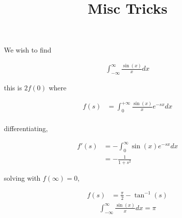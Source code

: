 \documentclass{article}
\title{Misc Tricks}
\date{}
\begin{document}
\maketitle

We wish to find

\begin{align}
\int_{-\infty}^{\infty} \frac{\sin(x)}{x} dx
\end{align}

this is $2f(0)$ where

\begin{align}
f(s)  &= \int_0^{+\infty} \frac{\sin(x)}{x} e^{-sx} dx \\
\end{align}

differentiating,

\begin{align}
f'(s) &=-\int_{0} ^\infty {\sin(x)}{e^{-sx}} dx \\
      &=-\frac{1}{1+s^2}
\end{align}

solving with $f(\infty)=0$, 

\begin{align}
f(s)  &=\frac{\pi}{2}-\tan^{-1}(s)
\end{align}
\begin{align}
\int_{-\infty} ^\infty \frac{\sin(x)}{x} dx ={\pi} 
\end{align}
\end{document}
